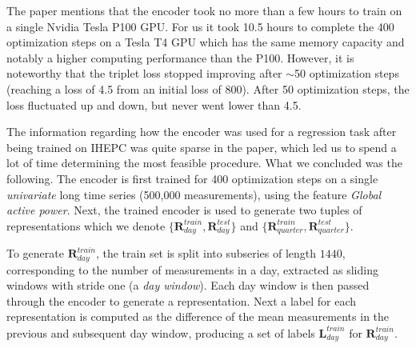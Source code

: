 The paper mentions that the encoder took no more than a few hours to train on a single Nvidia Tesla P100 GPU. For us it took 10.5 hours to complete the 400 optimization steps on a Tesla T4 GPU which has the same memory capacity and notably a higher computing performance than the P100. However, it is noteworthy that the triplet loss stopped improving after $\sim$50 optimization steps (reaching a loss of 4.5 from an initial loss of 800). After 50 optimization steps, the loss fluctuated up and down, but never went lower than 4.5.

The information regarding how the encoder was used for a regression task after being trained on IHEPC was quite sparse in the paper, which led us to spend a lot of time determining the most feasible procedure. What we concluded was the following. 
The encoder is first trained for 400 optimization steps on a single \textit{univariate} long time series (500,000 measurements), using the feature  \textit{Global active power}. 
Next, the trained encoder is used to generate two tuples of representations which we denote $\{\mathbf{R}_{day}^{train},\mathbf{R}_{day}^{test}\}$ and $\{\mathbf{R}_{quarter}^{train},\mathbf{R}_{quarter}^{test}\}$.

To generate $\mathbf{R}_{day}^{train}$, the train set is split into subseries of length $1440$, corresponding to the number of measurements in a day, extracted as sliding windows with stride one (a \textit{day window}). Each day window is then passed through the encoder to generate a representation. Next a label for each representation is computed as the difference of the mean measurements in the previous and subsequent day window, producing a set of labels $\mathbf{L}_{day}^{train}$ for $\mathbf{R}_{day}^{train}$.



